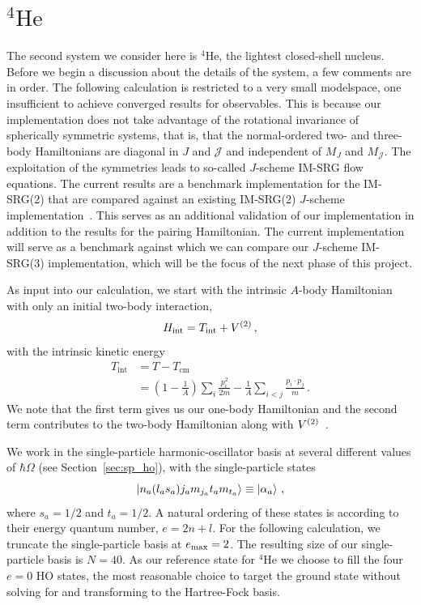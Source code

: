 \section{\texorpdfstring{${}^4\text{He}$}{Helium-4}}

The second system we consider here is ${}^4\text{He}$,
the lightest closed-shell nucleus.
Before we begin a discussion about the details of the system,
a few comments are in order.
The following calculation is restricted to a very small modelspace,
one insufficient to achieve converged results for observables.
This is because our implementation does not take advantage of the rotational invariance
of spherically symmetric systems,
that is, that the normal-ordered two- and three-body Hamiltonians
are diagonal in $J$ and $\mathcal{J}$
and independent of $M_{J}$ and $M_{\mathcal{J}}$.
The exploitation of the symmetries leads to so-called $J$-scheme IM-SRG flow equations.
The current results are a benchmark implementation for the IM-SRG(2)
that are compared against an existing IM-SRG(2) $J$-scheme implementation~\cite{Stro15imsrgcpp}.
This serves as an additional validation of our implementation
in addition to the results for the pairing Hamiltonian.
The current implementation will serve as a benchmark
against which we can compare our $J$-scheme IM-SRG(3) implementation,
which will be the focus of the next phase of this project.

As input into our calculation, we start with the intrinsic $A$-body Hamiltonian
with only an initial two-body interaction,
\begin{equation}
  H_{\text{int}} = T_{\text{int}} + {V}^{(2)}\,,
\end{equation}
with the intrinsic kinetic energy
\begin{align}
  T_{\text{int}} &= T - T_{\text{cm}} \\
                 &= \left(1 - \frac{1}{A}\right) \sum_{i} \frac{p_{i}^{2}}{2m}
                 - \frac{1}{A}\sum_{i<j}\frac{p_{i} \cdot p_{j}}{m}\,.
\end{align}
We note that the first term gives us our one-body Hamiltonian
and the second term contributes to the two-body Hamiltonian along with ${V}^{(2)}$~\cite{Herg09intrinsicham}.

We work in the single-particle harmonic-oscillator basis
at several different values of $\hbar \Omega$
(see Section~\ref{sec:sp_ho}),
with the single-particle states
\begin{equation}
  \ket{n_a (l_a s_a) j_a m_{j_a} t_a m_{t_a}} \equiv \ket{\alpha_a}\,,
\end{equation}
where $s_a=1/2$ and $t_a=1/2$.
A natural ordering of these states is according to their energy quantum number,
$e = 2  n + l$.
For the following calculation, we truncate the single-particle basis at $e_{\text{max}}=2$.
The resulting size of our single-particle basis is $N=40$.
As our reference state for ${}^4\text{He}$ we choose to fill the four $e=0$ HO states,
the most reasonable choice to target the ground state
without solving for and transforming to the Hartree-Fock basis.

